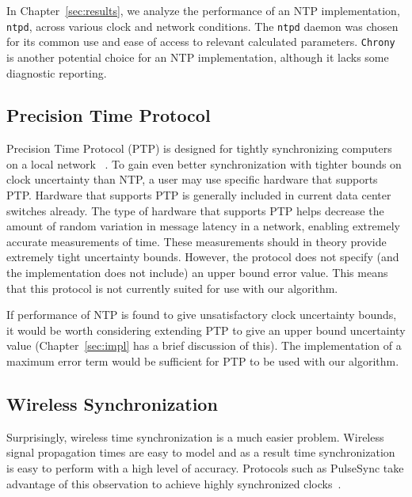 In Chapter~\ref{sec:results}, we analyze the performance of an NTP
implementation, \texttt{ntpd}, across various clock and network
conditions. The \texttt{ntpd} daemon was chosen for its common use and
ease of access to relevant calculated parameters. \texttt{Chrony} is
another potential choice for an NTP implementation, although it lacks
some diagnostic
reporting. %

\subsection{Precision Time Protocol}

Precision Time Protocol (PTP) is designed for tightly synchronizing
computers on a local network ~\citeyearpar{2008}. To gain even better
synchronization with tighter bounds on clock uncertainty than NTP, a
user may use specific hardware that supports PTP. Hardware that
supports PTP is generally included in current data center switches
already. The type of hardware that supports PTP helps decrease the
amount of random variation in message latency in a network, enabling
extremely accurate measurements of time.  These measurements should in
theory provide extremely tight uncertainty bounds. However, the
protocol does not specify (and the implementation does not include) an
upper bound error value. This means that this protocol is not
currently suited for use with our algorithm.

If performance of NTP is found to give unsatisfactory clock
uncertainty bounds, it would be worth considering extending PTP to
give an upper bound uncertainty value (Chapter~\ref{sec:impl} has a
brief discussion of this). The implementation of a maximum error term
would be sufficient for PTP to be used with our algorithm.


\subsection{Wireless Synchronization}

Surprisingly, wireless time synchronization is a much easier
problem. Wireless signal propagation times are easy to model and as a
result time synchronization is easy to perform with a high level of
accuracy. Protocols such as PulseSync take advantage of this
observation to achieve highly synchronized clocks~\citep{Lenzen2010}.

